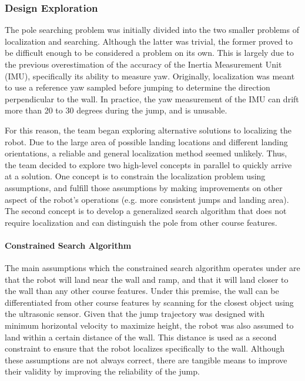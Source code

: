 \documentclass[ece]{uw-wkrpt}
\begin{document}
\subsubsection{Design Exploration}

The pole searching problem was initially divided into the two smaller problems of localization and searching. Although the latter was trivial, the former proved to be difficult enough to be considered a problem on its own. This is largely due to the previous overestimation of the accuracy of the Inertia Measurement Unit (IMU), specifically its ability to measure yaw. Originally, localization was meant to use a reference yaw sampled before jumping to determine the direction perpendicular to the wall. In practice, the yaw measurement of the IMU can drift more than 20 to 30 degrees during the jump, and is unusable. 

For this reason, the team began exploring alternative solutions to localizing the robot. Due to the large area of possible landing locations and different landing orientations, a reliable and general localization method seemed unlikely. Thus, the team decided to explore two high-level concepts in parallel to quickly arrive at a solution. One concept is to constrain the localization problem using assumptions, and fulfill those assumptions by making improvements on other aspect of the robot’s operations (e.g. more consistent jumps and landing area). The second concept is to develop a generalized search algorithm that does not require localization and can distinguish the pole from other course features. 

\paragraph{Constrained Search Algorithm}

The main assumptions which the constrained search algorithm operates under are that the robot will land near the wall and ramp, and that it will land closer to the wall than any other course features. Under this premise, the wall can be differentiated from other course features by scanning for the closest object using the ultrasonic sensor. Given that the jump trajectory was designed with minimum horizontal velocity to maximize height, the robot was also assumed to land within a certain distance of the wall. This distance is used as a second constraint to ensure that the robot localizes specifically to the wall. Although these assumptions are not always correct, there are tangible means to improve their validity by improving the reliability of the jump.
\end{document}
